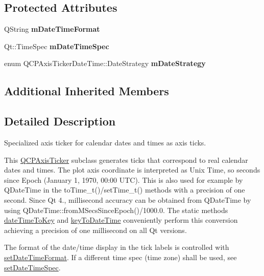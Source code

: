 \subsection*{Protected Attributes}
\begin{DoxyCompactItemize}
\item 
\mbox{\label{classQCPAxisTickerDateTime_adbbb25add598377998c0c57dbd29adaf}} 
Q\+String {\bfseries m\+Date\+Time\+Format}
\item 
\mbox{\label{classQCPAxisTickerDateTime_a5f5abe83c371f13eb3415585e638dba9}} 
Qt\+::\+Time\+Spec {\bfseries m\+Date\+Time\+Spec}
\item 
\mbox{\label{classQCPAxisTickerDateTime_a93fca912446ca341bee277cb2cc84e49}} 
enum Q\+C\+P\+Axis\+Ticker\+Date\+Time\+::\+Date\+Strategy {\bfseries m\+Date\+Strategy}
\end{DoxyCompactItemize}
\subsection*{Additional Inherited Members}


\subsection{Detailed Description}
Specialized axis ticker for calendar dates and times as axis ticks. 



This \hyperlink{classQCPAxisTicker}{Q\+C\+P\+Axis\+Ticker} subclass generates ticks that correspond to real calendar dates and times. The plot axis coordinate is interpreted as Unix Time, so seconds since Epoch (January 1, 1970, 00\+:00 U\+TC). This is also used for example by Q\+Date\+Time in the {\ttfamily to\+Time\+\_\+t()/set\+Time\+\_\+t()} methods with a precision of one second. Since Qt 4., millisecond accuracy can be obtained from Q\+Date\+Time by using {\ttfamily Q\+Date\+Time\+::from\+M\+Secs\+Since\+Epoch()/1000.0}. The static methods \hyperlink{classQCPAxisTickerDateTime_aa24f293f16fff0f937bf71f4140033f1}{date\+Time\+To\+Key} and \hyperlink{classQCPAxisTickerDateTime_a4c1761ad057f5564804a53f942629b53}{key\+To\+Date\+Time} conveniently perform this conversion achieving a precision of one millisecond on all Qt versions.

The format of the date/time display in the tick labels is controlled with \hyperlink{classQCPAxisTickerDateTime_ad52660a82f688395468674d555f6a86b}{set\+Date\+Time\+Format}. If a different time spec (time zone) shall be used, see \hyperlink{classQCPAxisTickerDateTime_afbd987c7197e42ab61e67fb1c38abebc}{set\+Date\+Time\+Spec}.

